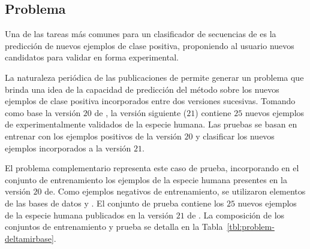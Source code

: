 %
%
\subsection{Problema \deltamirbase{}}
%
Una de las tareas más comunes para un clasificador de secuencias de
 es la predicción de nuevos ejemplos de clase positiva,
proponiendo al usuario nuevos {candidatos} para validar en forma
experimental.

La naturaleza periódica de las publicaciones de \work\mirbase{}
permite generar un problema que brinda una idea de la capacidad de
predicción del método sobre los nuevos ejemplos de clase positiva
incorporados entre dos versiones sucesivas.
Tomando como base la versión $20$ de \work\mirbase{}, la versión siguiente
($21$) contiene $25$ nuevos ejemplos de  experimentalmente
validados de la especie humana.
Las pruebas se basan en entrenar con los ejemplos positivos de la
versión $20$ y clasificar los nuevos ejemplos incorporados a la versión
$21$.

El problema complementario \prob\deltamirbase{} representa este caso
de prueba, incorporando en el conjunto de entrenamiento  los
ejemplos de la especie humana presentes en la versión $20$
de\work\mirbase{}.  Como ejemplos negativos de entrenamiento, se
utilizaron elementos de las bases de datos  \cite{xue} y
 \cite{batuwita}.
El conjunto de prueba contiene los $25$ nuevos ejemplos de la especie humana
publicados en la versión $21$ de \work\mirbase{}.
La composición de los conjuntos de entrenamiento y prueba se detalla en
la Tabla~\ref{tbl:problem-deltamirbase}.
